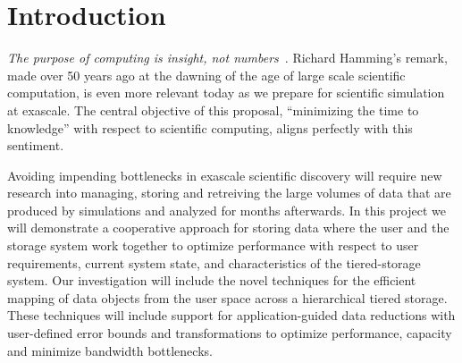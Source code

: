 \section{Introduction} 
\label{sec:introduction}

{\em The purpose of computing is insight, not numbers}~\cite{Hamming:book}.
Richard Hamming's remark, made over 50 years ago at the dawning of the age of
large scale scientific computation, is even more relevant today as we prepare
for scientific simulation at exascale. 
The central objective of this proposal, ``minimizing the time to knowledge''  
with respect to scientific computing, aligns perfectly with this sentiment. 

Avoiding impending bottlenecks in exascale scientific discovery will require
new research into managing, storing and retreiving the large volumes of data that are 
produced by simulations and analyzed for months afterwards.
%
In this project we will demonstrate a cooperative approach for storing data
where the user and the storage system work together to optimize performance with
respect to user requirements, current system state, and characteristics of the tiered-storage system.
Our investigation will include the novel techniques for the efficient mapping of data objects
from the user space across a hierarchical tiered storage. These techniques will
include support for application-guided data reductions with user-defined error bounds
and transformations to optimize performance, capacity and minimize bandwidth bottlenecks.

